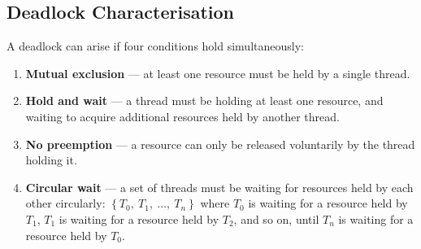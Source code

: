 \documentclass{article}
\begin{document}
\subsection{Deadlock Characterisation}
A deadlock can arise if four conditions hold simultaneously:
\begin{enumerate}
    \item \textbf{Mutual exclusion} --- at least one resource must be
          held by a single thread.
    \item \textbf{Hold and wait} --- a thread must be holding at least
          one resource, and waiting to acquire additional resources held
          by another thread.
    \item \textbf{No preemption} --- a resource can only be released
          voluntarily by the thread holding it.
    \item \textbf{Circular wait} --- a set of threads must be waiting
          for resources held by each other circularly:
          \(\left\{ T_0,\: T_1,\: \ldots,\: T_n \right\}\) where
          \(T_0\) is waiting for a resource held by \(T_1\), \(T_1\) is
          waiting for a resource held by \(T_2\), and so on, until
          \(T_n\) is waiting for a resource held by \(T_0\).
\end{enumerate}
\end{document}
